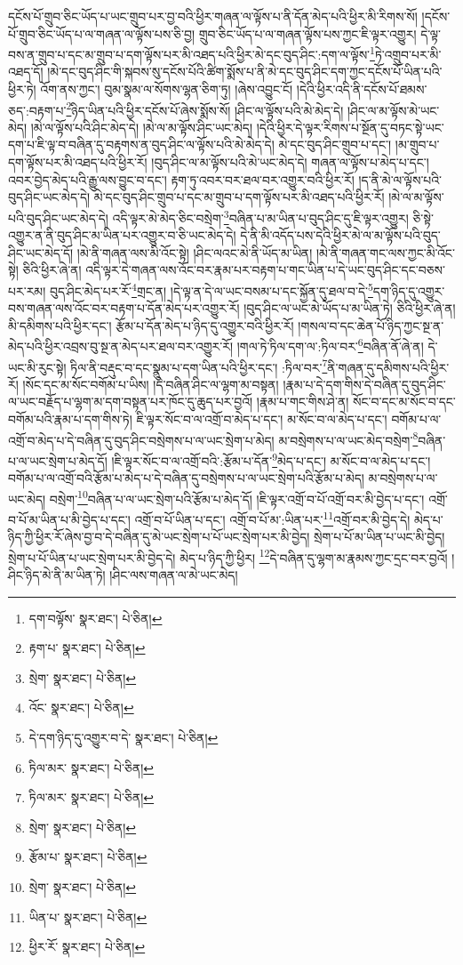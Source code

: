 དངོས་པོ་གྲུབ་ཅིང་ཡོད་པ་ཡང་གྲུབ་པར་བྱ་བའི་ཕྱིར་གཞན་ལ་ལྟོས་པ་ནི་དོན་མེད་པའི་ཕྱིར་མི་རིགས་སོ། །དངོས་པོ་གྲུབ་ཅིང་ཡོད་པ་ལ་གཞན་ལ་ལྟོས་པས་ཅི་བྱ། གྲུབ་ཅིང་ཡོད་པ་ལ་གཞན་ལྟོས་པས་ཀྱང་ཇི་ལྟར་འགྱུར། དེ་ལྟ་བས་ན་གྲུབ་པ་དང་མ་གྲུབ་པ་དག་ལྟོས་པར་མི་འཐད་པའི་ཕྱིར་མེ་དང་བུད་ཤིང་:དག་ལ་ལྟོས་\footnote{དག་བལྟོས་  སྣར་ཐང་།  པེ་ཅིན། }ཏེ་འགྲུབ་པར་མི་འཐད་དོ། །མེ་དང་བུད་ཤིང་གི་སྐབས་སུ་དངོས་པོའི་ཚིག་སྨོས་པ་ནི་མེ་དང་བུད་ཤིང་དག་ཀྱང་དངོས་པོ་ཡིན་པའི་ཕྱིར་ཏེ། འོག་ནས་ཀྱང་། བུམ་སྣམ་ལ་སོགས་ལྷན་ཅིག་ཏུ། །ཞེས་འབྱུང་ངོ། །དེའི་ཕྱིར་འདི་ནི་དངོས་པོ་ཐམས་ཅད་:བརྟག་པ་\footnote{རྟག་པ་  སྣར་ཐང་།  པེ་ཅིན། }ཉིད་ཡིན་པའི་ཕྱིར་དངོས་པོ་ཞེས་སྨོས་སོ། །ཤིང་ལ་ལྟོས་པའི་མེ་མེད་དེ། །ཤིང་ལ་མ་ལྟོས་མེ་ཡང་མེད། །མེ་ལ་ལྟོས་པའི་ཤིང་མེད་དེ། །མེ་ལ་མ་ལྟོས་ཤིང་ཡང་མེད། །དེའི་ཕྱིར་དེ་ལྟར་རིགས་པ་སྔོན་དུ་བཏང་སྟེ་ཡང་དག་པ་ཇི་ལྟ་བ་བཞིན་དུ་བརྟགས་ན་བུད་ཤིང་ལ་ལྟོས་པའི་མེ་མེད་དེ། མེ་དང་བུད་ཤིང་གྲུབ་པ་དང་། །མ་གྲུབ་པ་དག་ལྟོས་པར་མི་འཐད་པའི་ཕྱིར་རོ། །བུད་ཤིང་ལ་མ་ལྟོས་པའི་མེ་ཡང་མེད་དེ། གཞན་ལ་ལྟོས་པ་མེད་པ་དང་། འབར་བྱེད་མེད་པའི་རྒྱུ་ལས་བྱུང་བ་དང་། རྟག་ཏུ་འབར་བར་ཐལ་བར་འགྱུར་བའི་ཕྱིར་རོ། །ད་ནི་མེ་ལ་ལྟོས་པའི་བུད་ཤིང་ཡང་མེད་དེ། མེ་དང་བུད་ཤིང་གྲུབ་པ་དང་མ་གྲུབ་པ་དག་ལྟོས་པར་མི་འཐད་པའི་ཕྱིར་རོ། །མེ་ལ་མ་ལྟོས་པའི་བུད་ཤིང་ཡང་མེད་དེ། འདི་ལྟར་མེ་མེད་ཅིང་བསྲེག་\footnote{སྲེག་  སྣར་ཐང་།  པེ་ཅིན། }བཞིན་པ་མ་ཡིན་པ་བུད་ཤིང་དུ་ཇི་ལྟར་འགྱུར། ཅི་སྟེ་འགྱུར་ན་ནི་བུད་ཤིང་མ་ཡིན་པར་འགྱུར་བ་ཅི་ཡང་མེད་དེ། དེ་ནི་མི་འདོད་པས་དེའི་ཕྱིར་མེ་ལ་མ་ལྟོས་པའི་བུད་ཤིང་ཡང་མེད་དོ། །མེ་ནི་གཞན་ལས་མི་འོང་སྟེ། །ཤིང་ལའང་མེ་ནི་ཡོད་མ་ཡིན། །མེ་ནི་གཞན་གང་ལས་ཀྱང་མི་འོང་སྟེ། ཅིའི་ཕྱིར་ཞེ་ན། འདི་ལྟར་དེ་གཞན་ལས་འོང་བར་རྣམ་པར་བརྟག་པ་གང་ཡིན་པ་དེ་ཡང་བུད་ཤིང་དང་བཅས་པར་རམ། བུད་ཤིང་མེད་པར་རོ་\footnote{འོང་  སྣར་ཐང་།  པེ་ཅིན། }གྲང་ན། །དེ་ལྟ་ན་དེ་ལ་ཡང་བསམ་པ་དང་སྐྱོན་དུ་ཐལ་བ་དེ་\footnote{དེ་དག་ཉིད་དུ་འགྱུར་བ་དེ་  སྣར་ཐང་།  པེ་ཅིན། }དག་ཉིད་དུ་འགྱུར་བས་གཞན་ལས་འོང་བར་བརྟག་པ་དོན་མེད་པར་འགྱུར་རོ། །བུད་ཤིང་ལ་ཡང་མེ་ཡོད་པ་མ་ཡིན་ཏེ། ཅིའི་ཕྱིར་ཞེ་ན། མི་དམིགས་པའི་ཕྱིར་དང་། རྩོམ་པ་དོན་མེད་པ་ཉིད་དུ་འགྱུར་བའི་ཕྱིར་རོ། །གསལ་བ་དང་ཆེན་པོ་ཉིད་ཀྱང་སྔ་ན་མེད་པའི་ཕྱིར་འབྲས་བུ་སྔ་ན་མེད་པར་ཐལ་བར་འགྱུར་རོ། །གལ་ཏེ་ཏིལ་དག་ལ་:ཏིལ་བར་\footnote{ཏིལ་མར་  སྣར་ཐང་།  པེ་ཅིན། }བཞིན་ནོ་ཞེ་ན། དེ་ཡང་མི་རུང་སྟེ། ཏིལ་ནི་བརྡུང་བ་དང་སྣུམ་པ་དག་ཡིན་པའི་ཕྱིར་དང་། :ཏིལ་བར་\footnote{ཏིལ་མར་  སྣར་ཐང་།  པེ་ཅིན། }ནི་གཞན་དུ་དམིགས་པའི་ཕྱིར་རོ། །སོང་དང་མ་སོང་བགོམ་པ་ཡིས། །དེ་བཞིན་ཤིང་ལ་ལྷག་མ་བསྟན། །རྣམ་པ་དེ་དག་གིས་དེ་བཞིན་དུ་བུད་ཤིང་ལ་ཡང་བརྗོད་པ་ལྷག་མ་དག་བསྟན་པར་ཁོང་དུ་ཆུད་པར་བྱའོ། །རྣམ་པ་གང་གིས་ཤེ་ན། སོང་བ་དང་མ་སོང་བ་དང་བགོམ་པའི་རྣམ་པ་དག་གིས་ཏེ། ཇི་ལྟར་སོང་བ་ལ་འགྲོ་བ་མེད་པ་དང་། མ་སོང་བ་ལ་མེད་པ་དང་། བགོམ་པ་ལ་འགྲོ་བ་མེད་པ་དེ་བཞིན་དུ་བུད་ཤིང་བསྲེགས་པ་ལ་ཡང་སྲེག་པ་མེད། མ་བསྲེགས་པ་ལ་ཡང་མེད་བསྲེག་\footnote{སྲེག་  སྣར་ཐང་།  པེ་ཅིན། }བཞིན་པ་ལ་ཡང་སྲེག་པ་མེད་དོ། །ཇི་ལྟར་སོང་བ་ལ་འགྲོ་བའི་:རྩོམ་པ་དོན་\footnote{རྩོམ་པ་  སྣར་ཐང་།  པེ་ཅིན། }མེད་པ་དང་། མ་སོང་བ་ལ་མེད་པ་དང་། བགོམ་པ་ལ་འགྲོ་བའི་རྩོམ་པ་མེད་པ་དེ་བཞིན་དུ་བསྲེགས་པ་ལ་ཡང་སྲེག་པའི་རྩོམ་པ་མེད། མ་བསྲེགས་པ་ལ་ཡང་མེད། བསྲེག་\footnote{སྲེག་  སྣར་ཐང་།  པེ་ཅིན། }བཞིན་པ་ལ་ཡང་སྲེག་པའི་རྩོམ་པ་མེད་དོ། །ཇི་ལྟར་འགྲོ་བ་པོ་འགྲོ་བར་མི་བྱེད་པ་དང་། འགྲོ་བ་པོ་མ་ཡིན་པ་མི་བྱེད་པ་དང་། འགྲོ་བ་པོ་ཡིན་པ་དང་། འགྲོ་བ་པོ་མ་:ཡིན་པར་\footnote{ཡིན་པ་  སྣར་ཐང་།  པེ་ཅིན། }འགྲོ་བར་མི་བྱེད་དེ། མེད་པ་ཉིད་ཀྱི་ཕྱིར་རོ་ཞེས་བྱ་བ་དེ་བཞིན་དུ་མེ་ཡང་སྲེག་པ་པོ་ཡང་སྲེག་པར་མི་བྱེད། སྲེག་པ་པོ་མ་ཡིན་པ་ཡང་མི་བྱེད། སྲེག་པ་པོ་ཡིན་པ་ཡང་སྲེག་པར་མི་བྱེད་དེ། མེད་པ་ཉིད་ཀྱི་ཕྱིར། \footnote{ཕྱིར་རོ་  སྣར་ཐང་།  པེ་ཅིན། }དེ་བཞིན་དུ་ལྷག་མ་རྣམས་ཀྱང་དྲང་བར་བྱའོ། །ཤིང་ཉིད་མེ་ནི་མ་ཡིན་ཏེ། །ཤིང་ལས་གཞན་ལ་མེ་ཡང་མེད། 
